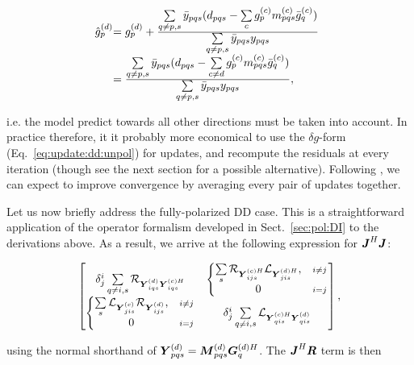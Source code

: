 \documentclass[useAMS,usenatbib]{mn2e}
\newcommand{\mat}[1]{{\bmath{#1}}}
\newcommand{\JJ}{\mat{J}} %
\newcommand{\JHJ}{\JJ^H\JJ} %
\begin{document}
\begin{equation}
\label{eq:stefcal:dd:unpol}
\begin{array}{@{}l@{}l}
\hat{g}_p^{(d)} &= \ggd_p + \frac{
\textstyle \sum\limits_{q\ne p,s} \bar{y}_{pqs} (d_{pqs} - \sum\limits_c \ggc_p \mmc_{pqs} \ggcH_q )
}{
\textstyle \sum\limits_{q\ne p,s} \bar{y}_{pqs} y_{pqs}
} \\
&= \frac{
\textstyle \sum\limits_{q\ne p,s} \bar{y}_{pqs} (d_{pqs} - \sum\limits_{c\ne d} \ggc_p \mmc_{pqs} \ggcH_q )
}{
\textstyle \sum\limits_{q\ne p,s} \bar{y}_{pqs} y_{pqs}
},
\end{array}
\end{equation}

i.e. the model predict towards all other directions must be taken into account. In practice therefore, it it probably more economical 
to use the $\delta g$-form (Eq.~\ref{eq:update:dd:unpol}) for updates, 
and recompute  the residuals at every iteration (though see the next section for a possible alternative). Following \citet{Stefcal}, 
we can expect to improve convergence by averaging every pair of updates together.

Let us now briefly address the fully-polarized DD case. This is a straightforward application of
the operator formalism developed in Sect.~\ref{sec:pol:DI} to the derivations above. As a result, we arrive at the
following expression for $\JHJ$:

\begin{equation}
\label{eq:JHJ:DD:pol}
\Matrix{cc}{
  \delta^i_j \sum\limits_{q\ne i,s} \Rop{\YYd_{iqs} \YYcH_{iqs}} & 
  \left \{ 
  \begin{array}{@{}cc@{}}
   \sum\limits_{s} \Rop{ \YYcH_{ijs}  } \Lop{\YYdH_{jis}},&{\scriptstyle i\ne j} \\
   0 &{\scriptstyle i=j}
  \end{array} \right . 
  \\
  \left \{ 
  \begin{array}{@{}cc@{}}
   \sum\limits_{s} \Lop{ \YYc_{jis}  } \Rop{\YYd_{ijs}},&{\scriptstyle i\ne j} \\
   0 &{\scriptstyle i=j}
  \end{array} \right . 
  &
  \delta^i_j \sum\limits_{q\ne i,s} \Lop{\YYcH_{qis}\YYd_{qis}}
},
\end{equation}

using the normal shorthand of $\YYd_{pqs} = \MMd_{pqs} \GGdH_q$. The $\JJ^H\bmath{R}$ term is then

\newcommand{\CCC}{\mathcal{C}}
\end{document}

